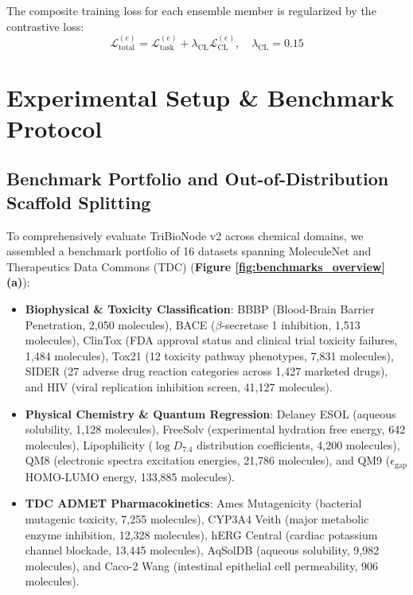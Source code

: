 \documentclass[10pt,twocolumn]{article}
\begin{document}
The composite training loss for each ensemble member is regularized by the contrastive loss:
\begin{equation}
\mathcal{L}_{\text{total}}^{(e)} = \mathcal{L}_{\text{task}}^{(e)} + \lambda_{\text{CL}} \mathcal{L}_{\text{CL}}^{(e)}, \quad \lambda_{\text{CL}} = 0.15
\label{eq:total_loss}
\end{equation}

\FloatBarrier
\section{Experimental Setup \& Benchmark Protocol}

\subsection{Benchmark Portfolio and Out-of-Distribution Scaffold Splitting}

To comprehensively evaluate TriBioNode v2 across chemical domains, we assembled a benchmark portfolio of 16 datasets spanning MoleculeNet \cite{wu2018moleculenet} and Therapeutics Data Commons (TDC) \cite{huang2021therapeutics} (\textbf{Figure \ref{fig:benchmarks_overview}(a)}):
\begin{itemize}
    \item \textbf{Biophysical \& Toxicity Classification}: BBBP (Blood-Brain Barrier Penetration, 2,050 molecules), BACE ($\beta$-secretase 1 inhibition, 1,513 molecules), ClinTox (FDA approval status and clinical trial toxicity failures, 1,484 molecules), Tox21 (12 toxicity pathway phenotypes, 7,831 molecules), SIDER (27 adverse drug reaction categories across 1,427 marketed drugs), and HIV (viral replication inhibition screen, 41,127 molecules).
    \item \textbf{Physical Chemistry \& Quantum Regression}: Delaney ESOL (aqueous solubility, 1,128 molecules), FreeSolv (experimental hydration free energy, 642 molecules), Lipophilicity ($\log D_{7.4}$ distribution coefficients, 4,200 molecules), QM8 (electronic spectra excitation energies, 21,786 molecules), and QM9 ($\epsilon_{\text{gap}}$ HOMO-LUMO energy, 133,885 molecules).
    \item \textbf{TDC ADMET Pharmacokinetics}: Ames Mutagenicity (bacterial mutagenic toxicity, 7,255 molecules), CYP3A4 Veith (major metabolic enzyme inhibition, 12,328 molecules), hERG Central (cardiac potassium channel blockade, 13,445 molecules), AqSolDB (aqueous solubility, 9,982 molecules), and Caco-2 Wang (intestinal epithelial cell permeability, 906 molecules).
\end{itemize}
\end{document}
